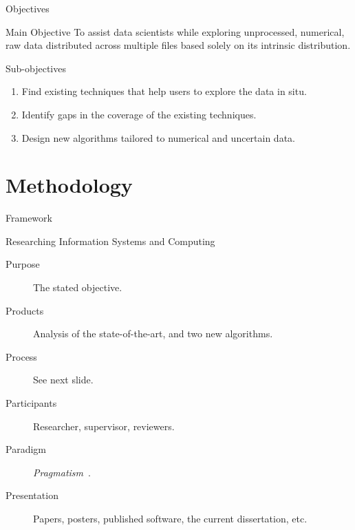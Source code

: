 \documentclass[10pt,notes]{beamer}
\begin{document}
\begin{frame}{Objectives}
\begin{alertblock}{Main Objective}
    \smallskip
    To assist data scientists while exploring unprocessed, numerical, raw data distributed across multiple
    files based solely on its intrinsic distribution.
\end{alertblock}

\begin{block}{Sub-objectives}
    \begin{enumerate}
        \item Find existing techniques that help users to explore the data in situ.
        \item Identify gaps in the coverage of the existing techniques.
        \item Design new algorithms tailored to numerical and uncertain data.
    \end{enumerate}
\end{block}

\end{frame}

\section{Methodology}

\begin{frame}{Framework}
\begin{block}{\alert{Researching Information Systems and Computing}~\cite{Oates2006}}

\begin{description}
    \item[Purpose] The stated objective.
    \item[Products] Analysis of the state-of-the-art, and two new algorithms.
    \item[Process] See next slide.
    \item[Participants] Researcher, supervisor, reviewers.
    \item[Paradigm] \emph{Pragmatism}~\cite{Shull2008}.
    \item[Presentation] Papers, posters, published software, the current dissertation, etc.
\end{description}

\end{block}

\end{frame}
\end{document}
